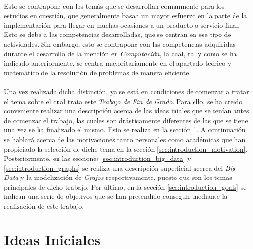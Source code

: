 \documentclass{subfiles}
\begin{document}
    \paragraph{}
    Esto se contrapone con los temás que se desarrollan comúnmente para los estudios en cuestión, que generalmente basan un mayor esfuerzo en la parte de la  implementación para llegar en muchas ocasiones a un producto o servicio final. Esto se debe a las competencias desarrolladas, que se centran en ese tipo de actividades. Sin embargo, esto se contrapone con las competencias adquiridas durante el desarrollo de la mención en \emph{Computación}, la cual, tal y como se ha indicado anteriormente, se centra mayoritariamente en el apartado teórico y matemático de la resolución de problemas de manera eficiente.

    \paragraph{}
    Una vez realizada dicha distinción, ya se está en condiciones de comenzar a tratar el tema sobre el cual trata este \emph{Trabajo de Fin de Grado}. Para ello, se ha creido conveniente realizar una descripción acerca de las ideas iniales que se tenían antes de comenzar el trabajo, las cuales son drásticamente diferentes de las que se tiene una vez se ha finalizado el mismo. Esto se realiza en la sección \ref{sec:introduction_initial_ideas}. A continuación se hablará acerca de las motivaciones tanto personales como académicas que han propiciado la selección de dicho tema en la sección \ref{sec:introduction_motivation}. Posteriormente, en las secciones \ref{sec:introduction_big_data} y \ref{sec:introduction_graphs} se realiza una descripción superficial acerca del \emph{Big Data} y la modelización de \emph{Grafos} respectivamente, puesto que son los temas principales de dicho trabajo. Por último, en la sección \ref{sec:introduction_goals} se indican una serie de objetivos que se han pretendido conseguir mediante la realización de este trabajo.

    \section{Ideas Iniciales}
    \label{sec:introduction_initial_ideas}
\end{document}

